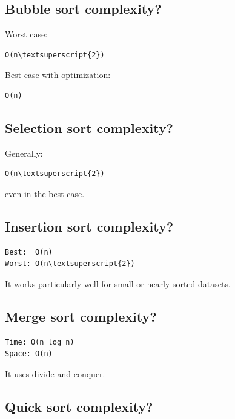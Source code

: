 \medskip

\subsection{Bubble sort complexity?}

Worst case:

\begin{lstlisting}
O(n\textsuperscript{2})
\end{lstlisting}

Best case with optimization:

\begin{lstlisting}
O(n)
\end{lstlisting}

\medskip

\subsection{Selection sort complexity?}

Generally:

\begin{lstlisting}
O(n\textsuperscript{2})
\end{lstlisting}

even in the best case.

\medskip

\subsection{Insertion sort complexity?}

\begin{lstlisting}
Best:  O(n)
Worst: O(n\textsuperscript{2})
\end{lstlisting}

It works particularly well for small or nearly sorted datasets.

\medskip

\subsection{Merge sort complexity?}

\begin{lstlisting}
Time: O(n log n)
Space: O(n)
\end{lstlisting}

It uses divide and conquer.

\medskip

\subsection{Quick sort complexity?}


